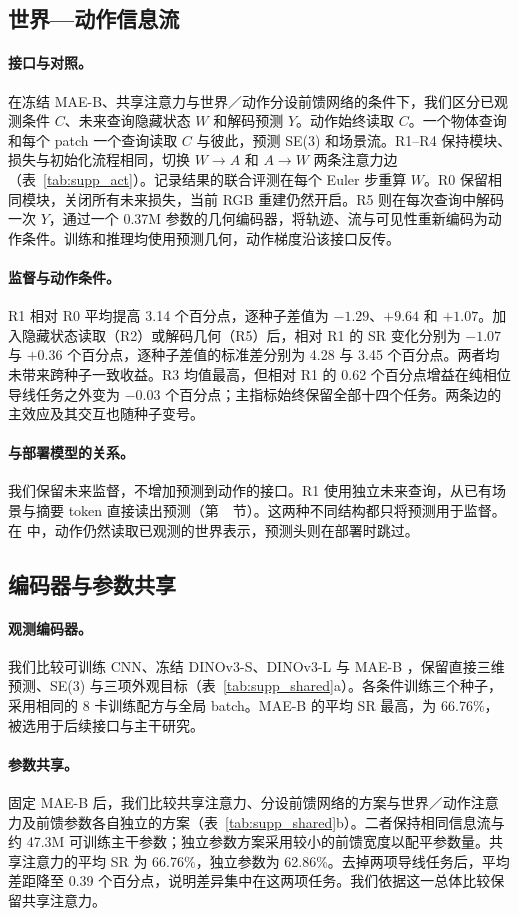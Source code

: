 \subsection{世界—动作信息流}
\label{app:design_act}


\paragraph{接口与对照。}
在冻结 MAE-B、共享注意力与世界／动作分设前馈网络的条件下，我们区分已观测条件 $C$、未来查询隐藏状态 $W$ 和解码预测 $Y$。动作始终读取 $C$。一个物体查询和每个 patch 一个查询读取 $C$ 与彼此，预测 SE(3) 和场景流。R1--R4 保持模块、损失与初始化流程相同，切换 $W\!\to\!A$ 和 $A\!\to\!W$ 两条注意力边（表~\ref{tab:supp_act}）。记录结果的联合评测在每个 Euler 步重算 $W$。R0 保留相同模块，关闭所有未来损失，当前 RGB 重建仍然开启。R5 则在每次查询中解码一次 $Y$，通过一个 0.37M 参数的几何编码器，将轨迹、流与可见性重新编码为动作条件。训练和推理均使用预测几何，动作梯度沿该接口反传。

\paragraph{监督与动作条件。}
R1 相对 R0 平均提高 3.14 个百分点，逐种子差值为 $-1.29$、$+9.64$ 和 $+1.07$。加入隐藏状态读取（R2）或解码几何（R5）后，相对 R1 的 SR 变化分别为 $-1.07$ 与 $+0.36$ 个百分点，逐种子差值的标准差分别为 4.28 与 3.45 个百分点。两者均未带来跨种子一致收益。R3 均值最高，但相对 R1 的 0.62 个百分点增益在纯相位导线任务之外变为 $-0.03$ 个百分点；主指标始终保留全部十四个任务。两条边的主效应及其交互也随种子变号。

\paragraph{与部署模型的关系。}
我们保留未来监督，不增加预测到动作的接口。R1 使用独立未来查询，\ours 从已有场景与摘要 token 直接读出预测（第~~节）。这两种不同结构都只将预测用于监督。在 \ours 中，动作仍然读取已观测的世界表示，预测头则在部署时跳过。

\subsection{编码器与参数共享}
\label{app:design_shared}


\paragraph{观测编码器。}
我们比较可训练 CNN、冻结 DINOv3-S、DINOv3-L \cite{dinov3} 与 MAE-B \cite{mae}，保留直接三维预测、SE(3) 与三项外观目标（表~\ref{tab:supp_shared}a）。各条件训练三个种子，采用相同的 8 卡训练配方与全局 batch。MAE-B 的平均 SR 最高，为 66.76\%，被选用于后续接口与主干研究。

\paragraph{参数共享。}
固定 MAE-B 后，我们比较共享注意力、分设前馈网络的方案与世界／动作注意力及前馈参数各自独立的方案（表~\ref{tab:supp_shared}b）。二者保持相同信息流与约 47.3M 可训练主干参数；独立参数方案采用较小的前馈宽度以配平参数量。共享注意力的平均 SR 为 66.76\%，独立参数为 62.86\%。去掉两项导线任务后，平均差距降至 0.39 个百分点，说明差异集中在这两项任务。我们依据这一总体比较保留共享注意力。
